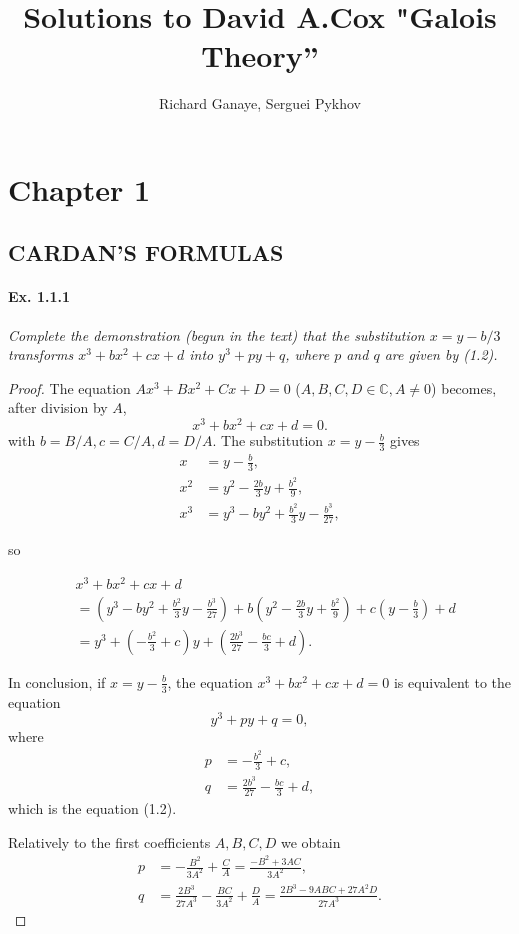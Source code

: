\documentclass[11pt,a4paper]{article}
\title{Solutions to David A.Cox  "Galois Theory''}
\author{Richard Ganaye, Serguei Pykhov}
\begin{document}
\maketitle

\section{Chapter 1}

\subsection{CARDAN'S FORMULAS}

\paragraph{Ex. 1.1.1}

{\it Complete the demonstration (begun in the text) that the substitution $x = y-b/3$ transforms $x^3+bx^2+cx+d$ into $y^3+py+q$, where $p$ and $q$ are given by (1.2).
}

\begin{proof}
The equation $Ax^3+Bx^2+Cx+D=0$ ($A,B,C,D \in \mathbb{C},A\neq 0$) becomes,  after division by $A$,
$$x^3+bx^2+cx+d = 0.$$
with $b=B/A,c=C/A,d=D/A.$
The substitution $x = y-\frac{b}{3}$ gives
 \begin{align*}
 x\ & = y-\frac{b}{3},\\
 x^2 &= y^2 -\frac{2b}{3} y +\frac{b^2}{9},\\
 x^3 &= y^3 -by^2+\frac{b^2}{3} y - \frac{b^3}{27},
 \end{align*}
 
so
 
 \begin{align*}
 &x^3+bx^2+cx+d\\
 &=\left(y^3 -by^2+\frac{b^2}{3} y - \frac{b^3}{27}\right) +b\left(y^2 -\frac{2b}{3} y +\frac{b^2}{9}\right)+c\left(y-\frac{b}{3}\right) +d\\
 &=y^3 +\left(-\frac{b^2}{3}+c \right) y + \left(\frac{2b^3}{27}-\frac{bc}{3}+d\right).
 \end{align*}

In conclusion, if $x = y-\frac{b}{3}$, the equation $x^3+bx^2+cx+d = 0$ is equivalent to the equation
$$y^3+py+q=0,$$
where
\begin{align*}
p &= -\frac{b^2}{3}+c, \\
 q &= \frac{2b^3}{27}-\frac{bc}{3}+d, 
 \end{align*}
which is the equation (1.2).

Relatively to the first coefficients $A,B,C,D$ we obtain
\begin{align*}
p &= -\frac{B^2}{3A^2} + \frac{C}{A} = \frac{-B^2+3AC}{3A^2},\\  
q &= \frac{2B^3}{27A^3} - \frac{BC}{3A^2} + \frac{D}{A} = \frac{2B^3-9ABC+27 A^2D}{27A^3}.
 \end{align*}
\end{proof}
\end{document}

